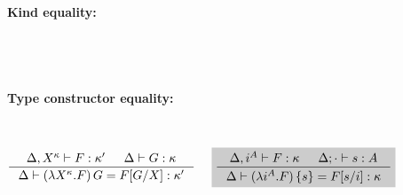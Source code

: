\begin{figure}
\paragraph{Kind equality:} ~~ 
 \qquad{}
~\\~\\
\paragraph{Type constructor equality:} ~~ 
\[ \inference{\Delta,X^\kappa |- F:\kappa' & \Delta |- G:\kappa}
             {\Delta |- (\lambda X^\kappa.F)\,G = F[G/X]:\kappa'}
 ~~~~ \newFi{
   \inference{\Delta,i^A |- F:\kappa & \Delta;\cdot |- s:A}
             {\Delta |- (\lambda i^A.F)\,\{s\} = F[s/i]:\kappa} }
\]
  ~~~~ 
~\\~\\

\end{figure}
